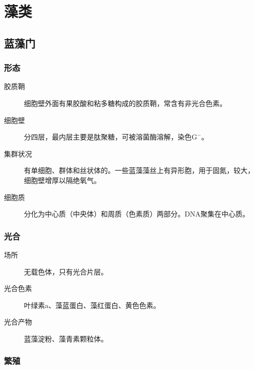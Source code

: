 \section{藻类}

\subsection{蓝藻门}

\subsubsection{形态}

\begin{description}
	\item[胶质鞘] 细胞壁外面有果胶酸和粘多糖构成的胶质鞘，常含有非光合色素。
	\item[细胞壁] 分四层，最内层主要是肽聚糖，可被溶菌酶溶解，染色$\text{G}^{-}$。
	\item[集群状况] 有单细胞、群体和丝状体的。一些蓝藻藻丝上有异形胞，用于固氮，较大，细胞壁增厚以隔绝氧气。
	\item[细胞质] 分化为中心质（中央体）和周质（色素质）两部分。DNA聚集在中心质。
\end{description}

\subsubsection{光合}

\begin{description}
	\item[场所] 无载色体，只有光合片层。
	\item[光合色素] 叶绿素a、藻蓝蛋白、藻红蛋白、黄色色素。
	\item[光合产物] 蓝藻淀粉、藻青素颗粒体。
\end{description}

\subsubsection{繁殖}

